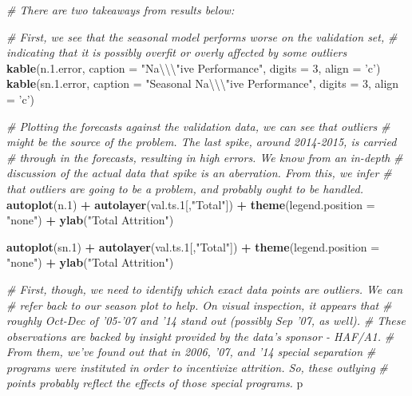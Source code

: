 \documentclass[12pt,letterpaper,toc=flat,oneside]{report}
\newenvironment{Shaded}{\begin{snugshade}}{\end{snugshade}}
\newcommand{\CharTok}[1]{\textcolor[rgb]{0.31,0.60,0.02}{#1}}
\newcommand{\CommentTok}[1]{\textcolor[rgb]{0.56,0.35,0.01}{\textit{#1}}}
\newcommand{\DataTypeTok}[1]{\textcolor[rgb]{0.13,0.29,0.53}{#1}}
\newcommand{\DecValTok}[1]{\textcolor[rgb]{0.00,0.00,0.81}{#1}}
\newcommand{\FloatTok}[1]{\textcolor[rgb]{0.00,0.00,0.81}{#1}}
\newcommand{\KeywordTok}[1]{\textcolor[rgb]{0.13,0.29,0.53}{\textbf{#1}}}
\newcommand{\NormalTok}[1]{#1}
\newcommand{\OperatorTok}[1]{\textcolor[rgb]{0.81,0.36,0.00}{\textbf{#1}}}
\newcommand{\StringTok}[1]{\textcolor[rgb]{0.31,0.60,0.02}{#1}}
\theoremstyle{definition}
\theoremstyle{definition}
\theoremstyle{definition}
\theoremstyle{remark}
\begin{document}
\begin{Shaded}
\begin{Highlighting}[]
{{{{{{{{{{{{{{{{\CommentTok{# There are two takeaways from results below:}

\CommentTok{# First, we see that the seasonal model performs worse on the validation set, }
\CommentTok{# indicating that it is possibly overfit or overly affected by some outliers}
\KeywordTok{kable}\NormalTok{(n.}\FloatTok{1.}\NormalTok{error, }\DataTypeTok{caption =} \StringTok{"Na}\CharTok{\textbackslash{}\textbackslash{}\textbackslash{}"}\StringTok{ive Performance"}\NormalTok{, }\DataTypeTok{digits =} \DecValTok{3}\NormalTok{, }\DataTypeTok{align =} \StringTok{'c'}\NormalTok{)}
\KeywordTok{kable}\NormalTok{(sn.}\FloatTok{1.}\NormalTok{error, }\DataTypeTok{caption =} \StringTok{"Seasonal Na}\CharTok{\textbackslash{}\textbackslash{}\textbackslash{}"}\StringTok{ive Performance"}\NormalTok{, }\DataTypeTok{digits =} \DecValTok{3}\NormalTok{, }\DataTypeTok{align =} \StringTok{'c'}\NormalTok{)}


\CommentTok{# Plotting the forecasts against the validation data, we can see that outliers}
\CommentTok{# might be the source of the problem. The last spike, around 2014-2015, is carried}
\CommentTok{# through in the forecasts, resulting in high errors. We know from an in-depth }
\CommentTok{# discussion of the actual data that spike is an aberration. From this, we infer}
\CommentTok{# that outliers are going to be a problem, and probably ought to be handled.}
\KeywordTok{autoplot}\NormalTok{(n}\FloatTok{.1}\NormalTok{) }\OperatorTok{+}
\StringTok{  }\KeywordTok{autolayer}\NormalTok{(val.ts}\FloatTok{.1}\NormalTok{[,}\StringTok{"Total"}\NormalTok{]) }\OperatorTok{+}
\StringTok{  }\KeywordTok{theme}\NormalTok{(}\DataTypeTok{legend.position =} \StringTok{"none"}\NormalTok{) }\OperatorTok{+}
\StringTok{  }\KeywordTok{ylab}\NormalTok{(}\StringTok{"Total Attrition"}\NormalTok{)}

\KeywordTok{autoplot}\NormalTok{(sn}\FloatTok{.1}\NormalTok{) }\OperatorTok{+}
\StringTok{  }\KeywordTok{autolayer}\NormalTok{(val.ts}\FloatTok{.1}\NormalTok{[,}\StringTok{"Total"}\NormalTok{]) }\OperatorTok{+}
\StringTok{  }\KeywordTok{theme}\NormalTok{(}\DataTypeTok{legend.position =} \StringTok{"none"}\NormalTok{) }\OperatorTok{+}
\StringTok{  }\KeywordTok{ylab}\NormalTok{(}\StringTok{"Total Attrition"}\NormalTok{)}

\CommentTok{# First, though, we need to identify which exact data points are outliers. We can }
\CommentTok{# refer back to our season plot to help. On visual inspection, it appears that }
\CommentTok{# roughly Oct-Dec of '05-'07 and '14 stand out (possibly Sep '07, as well).}
\CommentTok{# These observations are backed by insight provided by the data's sponsor - HAF/A1.}
\CommentTok{# From them, we've found out that in 2006, '07, and '14 special separation}
\CommentTok{# programs were instituted in order to incentivize attrition. So, these outlying }
\CommentTok{# points probably reflect the effects of those special programs.}
\NormalTok{p}

}}}}}}}}}}}}}}}}
\end{Highlighting}
\end{Shaded}
\end{document}
